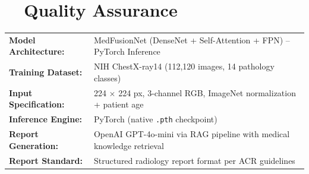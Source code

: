 \documentclass[11pt, a4paper]{article}
\begin{document}
\vspace{0.6em}

\section*{\faCheckCircle\ \ Quality Assurance}

\begin{patientcard}
\begin{tabularx}{\textwidth}{@{}>{\bfseries\small}l >{\small}X@{}}
  Model Architecture: & MedFusionNet (DenseNet + Self-Attention + FPN) -- PyTorch Inference \\[3pt]
  Training Dataset: & NIH ChestX-ray14 (112,120 images, 14 pathology classes) \\[3pt]
  Input Specification: & 224 $\times$ 224 px, 3-channel RGB, ImageNet normalization + patient age \\[3pt]
  Inference Engine: & PyTorch (native \texttt{.pth} checkpoint) \\[3pt]
  Report Generation: & OpenAI GPT-4o-mini via RAG pipeline with medical knowledge retrieval \\[3pt]
  Report Standard: & Structured radiology report format per ACR guidelines \\
\end{tabularx}
\end{patientcard}

\vspace{0.8em}
\end{document}
